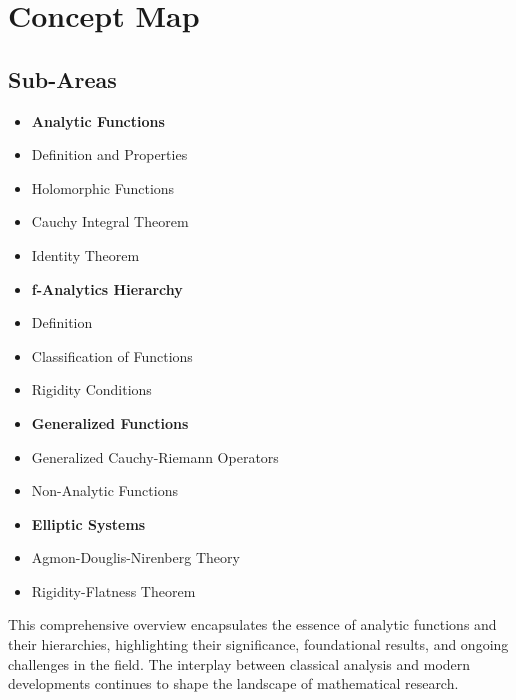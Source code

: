 \documentclass[11pt,a4paper]{article}
\begin{document}
\section{Concept Map}

\subsection{Sub-Areas}

\begin{itemize}
\item \textbf{Analytic Functions}
\item Definition and Properties
\item Holomorphic Functions
\item Cauchy Integral Theorem
\item Identity Theorem
\end{itemize}

\begin{itemize}
\item \textbf{f-Analytics Hierarchy}
\item Definition
\item Classification of Functions
\item Rigidity Conditions
\end{itemize}

\begin{itemize}
\item \textbf{Generalized Functions}
\item Generalized Cauchy-Riemann Operators
\item Non-Analytic Functions
\end{itemize}

\begin{itemize}
\item \textbf{Elliptic Systems}
\item Agmon-Douglis-Nirenberg Theory
\item Rigidity-Flatness Theorem
\end{itemize}

This comprehensive overview encapsulates the essence of analytic functions and their hierarchies, highlighting their significance, foundational results, and ongoing challenges in the field. The interplay between classical analysis and modern developments continues to shape the landscape of mathematical research.
\end{document}
